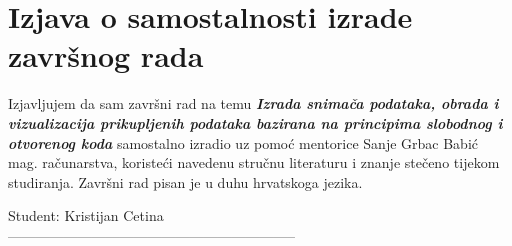 \chapter*{Izjava o samostalnosti izrade završnog rada}
Izjavljujem da sam završni rad na temu \textbf{\emph{Izrada snimača podataka, obrada i vizualizacija prikupljenih podataka bazirana na principima slobodnog i otvorenog koda}} samostalno izradio uz pomoć mentorice Sanje Grbac Babić mag. računarstva, koristeći navedenu stručnu literaturu i znanje stečeno tijekom studiranja.
Završni rad pisan je u duhu hrvatskoga jezika.
\vspace{\fill}
\begin{flushright}
Student: Kristijan Cetina\\
\vspace{15mm}
--------------------------------------------------------------
\end{flushright}